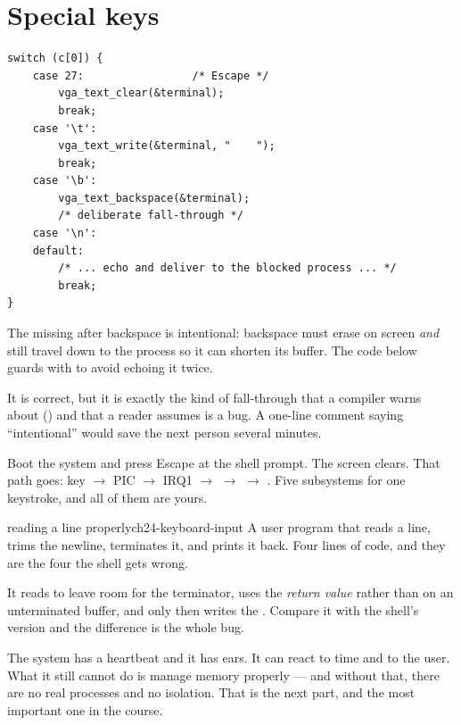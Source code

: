 \section{Special keys}

\begin{lstlisting}[style=c]
switch (c[0]) {
    case 27:                 /* Escape */
        vga_text_clear(&terminal);
        break;
    case '\t':
        vga_text_write(&terminal, "    ");
        break;
    case '\b':
        vga_text_backspace(&terminal);
        /* deliberate fall-through */
    case '\n':
    default:
        /* ... echo and deliver to the blocked process ... */
        break;
}
\end{lstlisting}

The missing  after backspace is intentional: backspace must erase on screen \emph{and}
still travel down to the process so it can shorten its buffer. The code below guards with
 to avoid echoing it twice.

It is correct, but it is exactly the kind of fall-through that a compiler warns about
() and that a reader assumes is a bug. A one-line comment saying
``intentional'' would save the next person several minutes.

\begin{tryit}
Boot the system and press Escape at the shell prompt. The screen clears. That path goes: key
$\rightarrow$ PIC $\rightarrow$ IRQ1 $\rightarrow$  $\rightarrow$
 $\rightarrow$ . Five subsystems for one keystroke, and
all of them are yours.
\end{tryit}

\begin{recipe}{reading a line properly}{ch24-keyboard-input}
A user program that reads a line, trims the newline, terminates it, and prints it back. Four lines
of code, and they are the four the shell gets wrong.

It reads  to leave room for the terminator, uses the \emph{return value} rather
than  on an unterminated buffer, and only then writes the .
Compare it with the shell's version and the difference is the whole bug.
\end{recipe}

\begin{summary}
The system has a heartbeat and it has ears. It can react to time and to the user. What it still
cannot do is manage memory properly --- and without that, there are no real processes and no
isolation. That is the next part, and the most important one in the course.
\end{summary}
